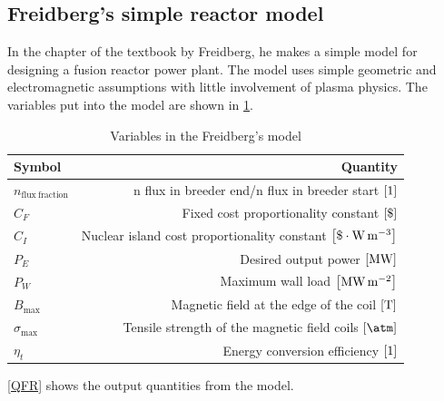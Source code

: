\subsection{Freidberg's simple reactor model}
In the  chapter of the textbook by Freidberg\cite{freidberg_plasma_2007}, he makes a simple model for designing a fusion reactor power plant.
The model uses simple geometric and electromagnetic assumptions with little involvement of plasma physics. The variables put into the model are shown in \cref{VFR}.
\begin{table}[H]
	\centering
	\begin{tabular}{lr}
		\toprule
		Symbol                         & Quantity                                                                                 \\
		\midrule
		\(n_\mathrm{flux \ fraction}\) & n flux in breeder end/n flux in breeder start \(\bqty{1}\)                                \\
		\(C_F\)                        & Fixed cost proportionality constant \(\bqty{\$}\)                                         \\
		\(C_I\)                        & Nuclear island cost proportionality constant \(\bqty{\$\cdot\si{\watt\per\meter\cubed}}\) \\
		\(P_E\)                        & Desired output power \(\bqty{\si{\mega\watt}}\)                                          \\
		\(P_W\)                        & Maximum wall load \(\bqty{\si{\mega\watt\per\meter\squared}}\)                           \\
		\(B_{\max}\)                   & Magnetic field at the edge of the coil \(\bqty{\si{\tesla}}\)                            \\
		\(\sigma_{\max}\)              & Tensile strength of the magnetic field coils \(\bqty{\si{\atm}}\)                        \\
		\(\eta_t\)                     & Energy conversion efficiency \(\bqty{1}\)                                                 \\
		\bottomrule
	\end{tabular}
	\caption{Variables in the Freidberg's model}
	\label{VFR}
\end{table}
\cref{QFR} shows the output quantities from the model.
